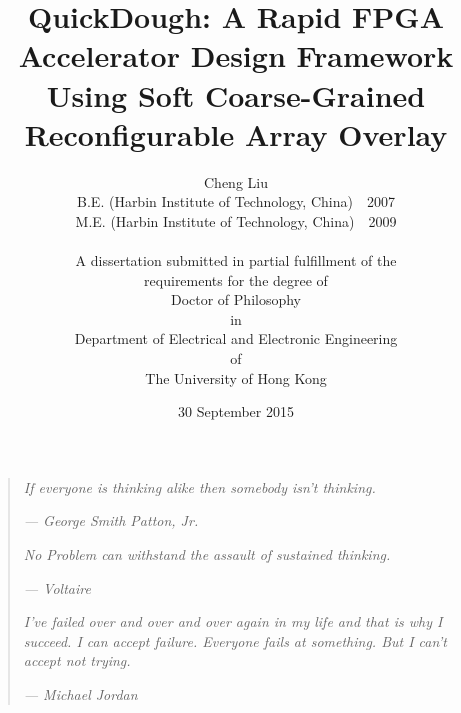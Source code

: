 \documentclass[12pt,a4paper]{report}
\begin{document}

%
\hfill

\title{QuickDough: A Rapid FPGA Accelerator Design 
Framework Using Soft Coarse-Grained Reconfigurable Array Overlay}

\author{Cheng Liu\\
B.E. (Harbin Institute of Technology, China)~~2007\\
M.E. (Harbin Institute of Technology, China)~~2009\\
\\
A dissertation submitted in partial fulfillment of the\\
requirements for the degree of\\
Doctor of Philosophy\\
in\\
Department of Electrical and Electronic Engineering\\
of\\
The University of Hong Kong} 

\date{30 September 2015}
\maketitle




\newpage
\section*{}

\hfill


\newpage
\begin{center}
\leavevmode
\vfill
\begin{quotation}
\textit{If everyone is thinking alike then somebody isn't thinking.}

\hfill \textsl{--- George Smith Patton, Jr.}

\vspace{1cm}

\textit{No Problem can withstand the assault of sustained thinking.}

\hfill \textsl{--- Voltaire}

\vspace{1cm}

\textit{I've failed over and over and over again in my life and that is why I succeed. I can accept failure. Everyone fails at something. But I can't accept not trying.}

\hfill \textsl{--- Michael Jordan}
\end{quotation}
\vfill
\end{center}
\end{document}

